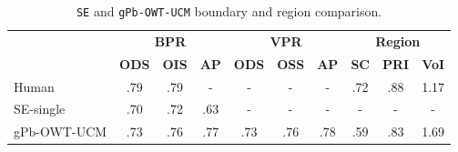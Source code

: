 \begin{table}[htbp]
\renewcommand{\arraystretch}{1.3}
\centering
\scriptsize
\begin{tabular}{l|c|c|c||c|c|c||c|c|c|}
\cline{2-10} %
\multirow{2}{*}{} & \multicolumn{3}{c||}{\textbf{BPR}} & \multicolumn{3}{c||}{\textbf{VPR}}& \multicolumn{3}{c|}{\textbf{Region}}\\
\cline{2-10}
& \textbf{ODS}  & \textbf{OIS} & \textbf{AP} %
& \textbf{ODS} & \textbf{OSS} & \textbf{AP} %
& \textbf{SC} & \textbf{PRI} & \textbf{VoI} \\
\hline
\multicolumn{1}{|l|}{Human} & .79 & .79 & - & - & - & - & .72 & .88 & 1.17 \\ %
\hline
\hline
\multicolumn{1}{|l|}{\cite{DollarICCV13edges} SE-single} & .70 & .72 & .63 & - & - & - & - & - & - \\
\hline
\multicolumn{1}{|l|}{\cite{Arbelaez11} gPb-OWT-UCM} & .73 & .76 & .77 & .73 & .76 & .78 & .59 & .83 & 1.69 \\
\hline
\end{tabular}
\caption[{\tt SE} and {\tt gPb-OWT-UCM} boundary and region comparison]{{\tt SE} and {\tt gPb-OWT-UCM} boundary and region comparison.}
\label{tab:SE_vs_gPb_OWT_UCM}
\end{table}

